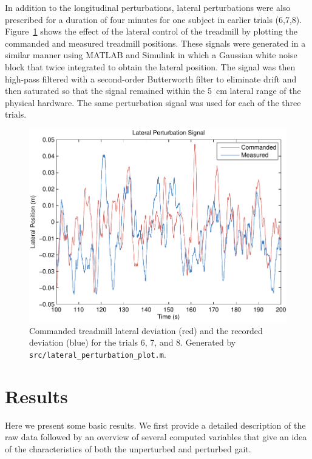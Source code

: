 \documentclass[fleqn,12pt]{wlpeerj}
\begin{document}
In addition to the longitudinal perturbations, lateral perturbations were also
prescribed for a duration of four minutes for one subject in earlier trials
(6,7,8). Figure~\ref{fig:lateral_perturbation} shows the effect of the lateral
control of the treadmill by plotting the commanded and measured treadmill
positions. These signals were generated in a similar manner using MATLAB and
Simulink in which a Gaussian white noise block that twice integrated to obtain
the lateral position. The signal was then high-pass filtered with a
second-order Butterworth filter to eliminate drift and then saturated so that
the signal remained within the 5~\si{\centi\meter} lateral range of the
physical hardware.  The same perturbation signal was used for each of the three
trials.
%
\begin{figure}
  \centering
  \includegraphics{figures/lateral_perturbation.pdf}
  \cprotect\caption{Commanded treadmill lateral deviation (red) and the
    recorded deviation (blue) for the trials 6, 7, and 8. Generated by
    \verb|src/lateral_perturbation_plot.m|.}
  \label{fig:lateral_perturbation}
\end{figure}

\section*{Results}
%
Here we present some basic results. We first provide a detailed description of
the raw data followed by an overview of several computed variables that give an
idea of the characteristics of both the unperturbed and perturbed gait.
\end{document}
